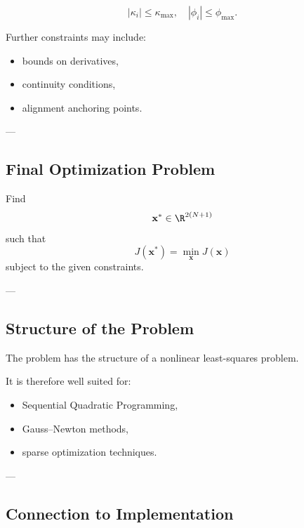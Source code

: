 \begin{definition}
\[
|\kappa_i| \le \kappa_{\max},
\quad
|\phi_i| \le \phi_{\max}.
\]
\end{definition}

\begin{remark}
Further constraints may include:
\begin{itemize}
\item bounds on derivatives,
\item continuity conditions,
\item alignment anchoring points.
\end{itemize}
\end{remark}

---

\subsection{Final Optimization Problem}

\begin{definition}
Find
\[
\mathbf{x}^\ast \in \R^{2(N+1)}
\]
such that
\[
J(\mathbf{x}^\ast)
=
\min_{\mathbf{x}} J(\mathbf{x})
\]
subject to the given constraints.
\end{definition}

---

\subsection{Structure of the Problem}

\begin{remark}
The problem has the structure of a nonlinear least-squares problem.
\end{remark}

\begin{remark}
It is therefore well suited for:
\begin{itemize}
\item Sequential Quadratic Programming,
\item Gauss--Newton methods,
\item sparse optimization techniques.
\end{itemize}
\end{remark}

---

\subsection{Connection to Implementation}

